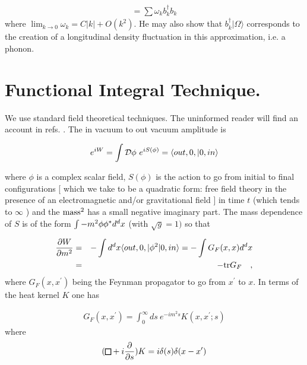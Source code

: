 \documentclass[12pt,oneside]{report}
\newcommand\Dalamb{\mathchoice\sqr68\sqr68\sqr{4.2}6\sqr{3}6}
\def\sqr#1#2{{\vcenter{\vbox{\hrule height.#2pt
          \hbox{\vrule width.#2pt height#1pt \kern#1pt
           \vrule width.#2pt}
           \hrule height.#2pt}}}}
\begin{document}
\begin{eqnarray}
[ H - < \Omega \vert H \vert \Omega > ] = \sum \omega _k b_{k}
^{\dagger} b_k \label {A.6}
\end{eqnarray}
where $ \lim_{k\to 0}\omega _k = C \vert k \vert +
O(k^2)$. He may also show that $ b_{k} ^{\dagger} \vert 
\Omega \rangle$
corresponds to the creation of a longitudinal density fluctuation
in this approximation, i.e. a phonon.





\chapter{ 
Functional Integral Technique. }\label{functint}



We use standard field theoretical techniques. The uninformed
reader will find an account in refs. \cite{Schw}\cite{BD}\cite{PaBr0}.
The in	vacuum to out
vacuum amplitude is

\begin{eqnarray}
e^{iW} = \int {\cal D} \phi\  e^{i S (\phi)} = \langle out, 0, \vert 0, in\rangle 
\label {A.7} 
\end{eqnarray}

\noindent where $ \phi$ is a complex scalar field, $ S(\phi) $ is the
action to go from initial to final configurations [ which we take
to be a quadratic form: free field theory in the presence of an
electromagnetic and/or gravitational field ] in time $ t $ (which
tends to $ \infty $ ) and the $\rm mass^2 $ has a
small negative imaginary part. The mass dependence of $ S $ is of
the form $ \int -m^2 \phi \phi^*\/d^d x $ (with $ \sqrt g = 1) $ so that

\begin{eqnarray}
{\partial W \over \partial m^2}& =& -
 \int d^d x \langle out, 0, \vert 
 \phi^2 \vert0, in\rangle  = - \int G_F (x, x) d^d x \nonumber\\
& = & - {\rm tr} G_F \quad ,\label {A.8}
\end{eqnarray}
where $ G_F (x, x^{\prime}) $ being the Feynman propagator to go from $
x^{\prime}$ to $ x $. In terms of the heat kernel $K$ one has

\begin{eqnarray}
G_F (x, x^{\prime}) = \int_{0} ^{\infty} \!ds\  e^{- i m^2 s} K(x,
x^{\prime}; s) \label {F.9}
\end{eqnarray}
where
\begin{eqnarray}
(\Dalamb + i {\partial \over \partial s}) K = i \delta
(s)\delta(x-x^{\prime}) \label {F.10} 
\end{eqnarray}
\end{document}
